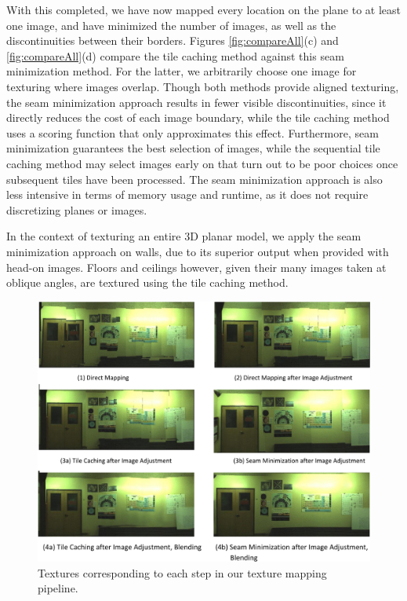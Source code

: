 \documentclass[10pt,twocolumn,letterpaper]{article}
\begin{document}
With this completed, we have now mapped every location on the plane to
at least one image, and have minimized the number of images, as well
as the discontinuities between their borders. Figures \ref{fig:compareAll}(c) and
\ref{fig:compareAll}(d) compare the tile caching method against this
seam minimization method. For the latter, we arbitrarily choose one image for texturing where images overlap. Though both methods provide aligned texturing, the seam minimization approach results in fewer
visible discontinuities, since it directly reduces the cost of each
image boundary, while the tile caching method uses a scoring function
that only approximates this effect. Furthermore, seam minimization
guarantees the best selection of images, while the sequential tile
caching method may select images early on that turn out to be poor
choices once subsequent tiles have been processed. The seam
minimization approach is also less intensive in terms of memory usage
and runtime, as it does not require discretizing planes or images.

In the context of texturing an entire 3D planar model, we apply the seam
minimization approach on walls, due to its superior output when
provided with head-on images. Floors and ceilings however, given their
many images taken at oblique angles, are textured using the tile caching method.

\begin{figure}
  \centering
  \includegraphics[width=6in]{pipelineimages.pdf}
  \caption{Textures corresponding to each step in our texture mapping
    pipeline.}
  \label{fig:pipelineimages}
\end{figure}
\end{document}
